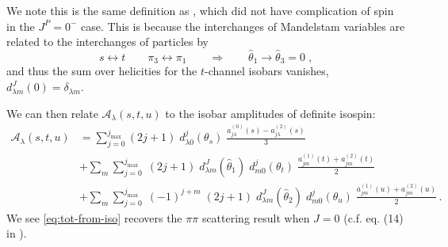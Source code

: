 \documentclass[10pt, aps,prd,amsmath,amssymb,superscriptaddress,onecolumn,
nofootinbib,showpacs,preprintnumbers]{revtex4-1}
\newcommand{\jmax}{{j_\text{max}}}
\begin{document}
We note this is the same definition as \cite{Albaladejo2018}, which did not have complication of spin in the \(J^P = 0^-\) case. This is because the interchanges of Mandelstam variables are related to the interchanges of particles by
  \begin{equation}
    s\leftrightarrow  t  \qquad \pi_3 \leftrightarrow \pi_1 \qquad \Rightarrow \qquad \hat{\theta}_1 \to \hat{\theta}_3 = 0 \; ,
  \end{equation}
and thus the sum over helicities for the \(t\)-channel isobars vanishes, \(d_{\lambda m}^J(0) = \delta_{\lambda m} \).

We can then relate \(\mathcal{A}_\lambda(s,t,u)\) to the isobar amplitudes of definite isospin:
  \begin{align}
    \label{eq:tot-from-iso}
    \mathcal{A}_\lambda(s,t,u) &= \sum_{j = 0}^\jmax
      (2j + 1) \; d_{\lambda 0}^j(\theta_s) \;
      \frac{
     a_{j \lambda}^{(0)}(s) - a_{j \lambda}^{(2)}(s)
     }{
     3
     } \nonumber \\
     &+ \sum_m \sum_{j=0}^\jmax \; (2j+1)
     \; d^{J}_{\lambda m}(\hat{\theta}_1) \; d_{m0}^j(\theta_t) \;
     \frac{
     a^{(1)}_{j m}(t) + a^{(2)}_{j m}(t)
     }{
     2
     } \\
     &+ \sum_m \sum_{j=0}^\jmax \; (-1)^{j + m} \; (2j+1)
     \; d^{J}_{\lambda m}(\hat{\theta}_2) \; d_{m0}^j(\theta_u) \;
     \frac{
     a^{(1)}_{jm}(u) + a^{(2)}_{j m}(u)
     }{
     2
     } \, . \nonumber
  \end{align}
We see \cref{eq:tot-from-iso} recovers the \(\pi\pi\) scattering result when \(J = 0\) (c.f. eq. (14) in \cite{Albaladejo2018}).
\end{document}
